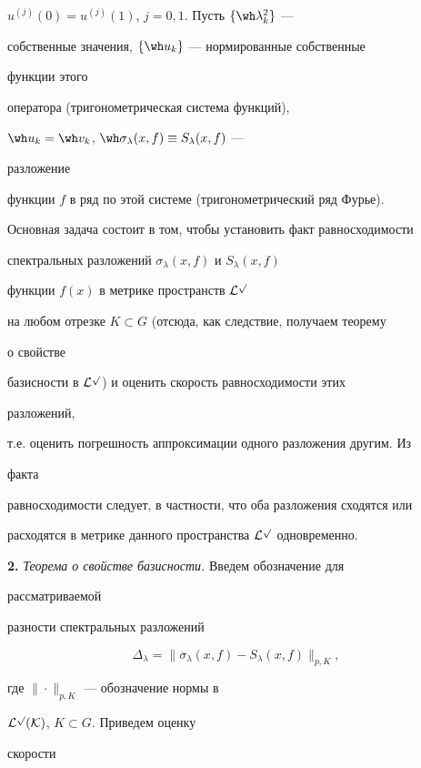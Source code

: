 $u^{(j)}(0)=u^{(j)}(1)$, $j=0,1$. Пусть $\{\wh\lambda^2_k\}$ ---


собственные значения, $\{\wh u_k\}$ --- нормированные собственные


функции этого


оператора (тригонометрическая система функций),


$\wh u_k=\wh v_k$, $\wh\sigma_\lambda(x,f)\equiv S_\lambda(x,f)$ ---


разложение


функции $f$ в ряд по этой системе (тригонометрический ряд Фурье).





Основная задача состоит в том, чтобы установить факт равносходимости


спектральных разложений $\sigma_\lambda(x,f)$ и $S_\lambda(x,f)$


функции $f(x)$ в метрике пространств $\cal L^p$


на любом отрезке $K\subset G$ (отсюда, как следствие, получаем теорему


о свойстве


базисности в $\cal L^p$) и оценить скорость равносходимости этих


разложений,


т.е. оценить погрешность аппроксимации одного разложения другим. Из


факта


равносходимости следует, в частности, что оба разложения сходятся или


расходятся в метрике данного пространства $\cal L^p$ одновременно.


\medskip





{\bf 2.} {\it Теорема о свойстве базисности.} Введем обозначение для


рассматриваемой


разности спектральных разложений


\begin{equation}


\Delta_\lambda=\|\sigma_\lambda(x,f)-S_\lambda(x,f)\|_{p,K},


\end{equation}


где $\|\cdot\|_{p,K}$ --- обозначение нормы в


$\cal L^p(K)$, $K\subset G$. Приведем оценку


скорости


